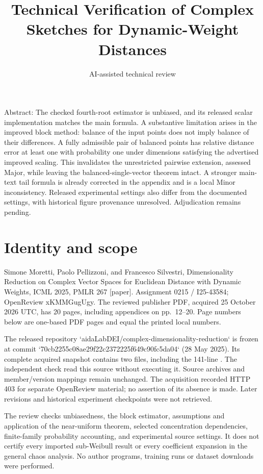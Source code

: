 \documentclass[10pt]{article}
\title{Technical Verification of Complex Sketches for Dynamic-Weight Distances}
\author{AI-assisted technical review}
\date{}
\begin{document}
\maketitle
Abstract: The checked fourth-root estimator is unbiased, and its released scalar implementation matches the main formula. A substantive limitation arises in the improved block method: balance of the input points does not imply balance of their differences. A fully admissible pair of balanced points has relative distance error at least one with probability one under dimensions satisfying the advertised improved scaling. This invalidates the unrestricted pairwise extension, assessed Major, while leaving the balanced-single-vector theorem intact. A stronger main-text tail formula is already corrected in the appendix and is a local Minor inconsistency. Released experimental settings also differ from the documented settings, with historical figure provenance unresolved. Adjudication remains pending.\par
\section*{Identity and scope}
Simone Moretti, Paolo Pellizzoni, and Francesco Silvestri, Dimensionality Reduction on Complex Vector Spaces for Euclidean Distance with Dynamic Weights, ICML 2025, PMLR 267 [paper]. Assignment 0215 / I25-43584; OpenReview xKMMGugUgy. The reviewed publisher PDF, acquired 25 October 2026 UTC, has 20 pages, including appendices on pp. 12–20. Page numbers below are one-based PDF pages and equal the printed local numbers.\par
The released repository `aidaLabDEI/complex-dimensionality-reduction` is frozen at commit `70cb2255c08ae29f22c2372225f649c90fc5da04` (28 May 2025). Its complete acquired snapshot contains two files, including the 141-line . The independent check read this source without executing it. Source archives and member/version mappings remain unchanged. The acquisition recorded HTTP 403 for separate OpenReview material; no assertion of its absence is made. Later revisions and historical experiment checkpoints were not retrieved.\par
The review checks unbiasedness, the block estimator, assumptions and application of the near-uniform theorem, selected concentration dependencies, finite-family probability accounting, and experimental source settings. It does not certify every imported sub-Weibull result or every coefficient expansion in the general chaos analysis. No author programs, training runs or dataset downloads were performed.\par
\end{document}
